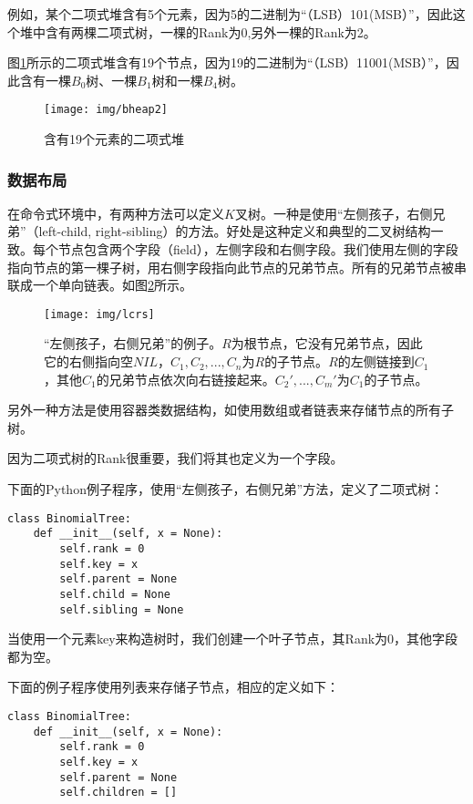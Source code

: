 \documentclass{ctexart}
\begin{document}
例如，某个二项式堆含有5个元素，因为5的二进制为“（LSB）101(MSB）”，因此这个堆中含有两棵二项式树，一棵的Rank为0,另外一棵的Rank为2。

图\ref{fig:bheap2}所示的二项式堆含有19个节点，因为19的二进制为“（LSB）11001(MSB）”，因此含有一棵$B_0$树、一棵$B_1$树和一棵$B_4$树。

\begin{figure}[htbp]
  \centering
  \texttt{[image: img/bheap2]}
  \caption{含有19个元素的二项式堆} \label{fig:bheap2}
\end{figure}

\subsubsection{数据布局}

在命令式环境中，有两种方法可以定义$K$叉树。一种是使用“左侧孩子，右侧兄弟”（left-child, right-sibling）的方法\cite{CLRS}。好处是这种定义和典型的二叉树结构一致。每个节点包含两个字段（field），左侧字段和右侧字段。我们使用左侧的字段指向节点的第一棵子树，用右侧字段指向此节点的兄弟节点。所有的兄弟节点被串联成一个单向链表。如图\ref{fig:lcrs}所示。

\begin{figure}[htbp]
  \centering
  \texttt{[image: img/lcrs]}
  \caption{“左侧孩子，右侧兄弟”的例子。$R$为根节点，它没有兄弟节点，因此它的右侧指向空$NIL$，$C_1, C_2, ..., C_n$为$R$的子节点。$R$的左侧链接到$C_1$，其他$C_1$的兄弟节点依次向右链接起来。$C_2', ..., C_m'$为$C_1$的子节点。} \label{fig:lcrs}
\end{figure}

另外一种方法是使用容器类数据结构，如使用数组或者链表来存储节点的所有子树。

因为二项式树的Rank很重要，我们将其也定义为一个字段。

下面的Python例子程序，使用“左侧孩子，右侧兄弟”方法，定义了二项式树：

\lstset{language=Python}
\begin{lstlisting}
class BinomialTree:
    def __init__(self, x = None):
        self.rank = 0
        self.key = x
        self.parent = None
        self.child = None
        self.sibling = None
\end{lstlisting}

当使用一个元素key来构造树时，我们创建一个叶子节点，其Rank为0，其他字段都为空。

下面的例子程序使用列表来存储子节点，相应的定义如下：

\begin{lstlisting}
class BinomialTree:
    def __init__(self, x = None):
        self.rank = 0
        self.key = x
        self.parent = None
        self.children = []
\end{lstlisting}
\end{document}
